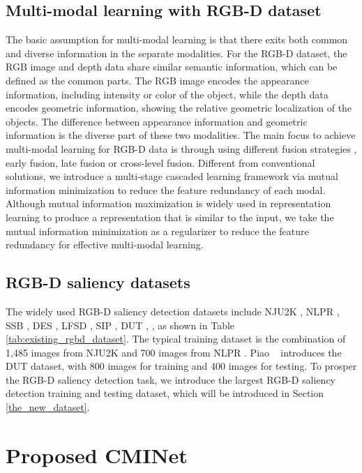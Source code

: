 \documentclass[10pt,twocolumn,letterpaper]{article}
\def\ourmodel{CMINet}
\begin{document}
\subsection{Multi-modal learning with RGB-D dataset}
The basic assumption for multi-modal learning is that there exits both common and diverse information in the separate modalities. For the RGB-D dataset, the RGB image and depth data share similar semantic information, which can be defined as the common parts. The RGB image encodes the appearance information, including intensity or color of the object, while the depth data encodes geometric information, showing the relative geometric localization of the objects. The difference between appearance information and geometric information is the diverse part of these two modalities. The main focus to achieve multi-modal learning for RGB-D data is through using different fusion strategies \cite{wang2018depthconv,real_time_rgbd_semantic,Luo2020CascadeGN,ASIF-Net}, \eg early fusion, late fusion or cross-level fusion. Different from conventional solutions, we introduce a multi-stage cascaded learning framework via mutual information minimization to reduce the feature redundancy of each modal. Although mutual information maximization \cite{Informax_book,TscDjoRubGelLuc20} is widely used in representation learning to produce a representation that is similar to the input, we take the mutual information minimization as a regularizer
to reduce the feature redundancy for effective multi-modal learning.


\subsection{RGB-D saliency datasets}
The widely used RGB-D saliency detection datasets include NJU2K \cite{NJU2000}, NLPR \cite{peng2014rgbd}, SSB \cite{niu2012leveraging}, DES \cite{cheng2014depth}, LFSD \cite{li2014saliency}, SIP \cite{sip_dataset}, DUT \cite{dmra_iccv19}, \etc, as shown in Table \ref{tab:existing_rgbd_dataset}. The typical training dataset
is the combination of 1,485 images from NJU2K \cite{NJU2000} and 700 images from NLPR \cite{peng2014rgbd}. Piao \etal~\cite{dmra_iccv19} introduces the DUT dataset, with 800 images
for training and 400 images for testing.
To prosper the RGB-D saliency detection task, we introduce the largest RGB-D saliency detection training and testing dataset, which will be introduced in Section \ref{the_new_dataset}.



\section{Proposed \ourmodel}
\label{our_method}
\end{document}
